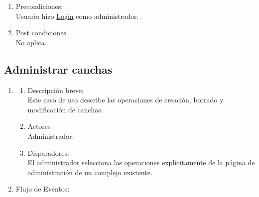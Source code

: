 \documentclass[a4paper,11pt]{article}
\begin{document}
\begin{enumerate}
    \item Precondiciones: \\
        Usuario hizo \underline{Login} como administrador.

    \item Post condiciones \\
        No aplica.

\end{enumerate}


\subsection{Administrar canchas}
\begin{enumerate}

    \item
    \begin{enumerate}
    \item Descripción breve: \\
        Este caso de uso describe las operaciones de creación, borrado y
        modificación de canchas.
    \item Actores \\
        Administrador.
    \item Disparadores: \\
        El administrador selecciona las operaciones explícitamente de la página
        de administración de un complejo existente.
    \end{enumerate}

    \item Flujo de Eventos: 

    \begin{enumerate}


\end{enumerate}
\end{enumerate}
\end{document}
